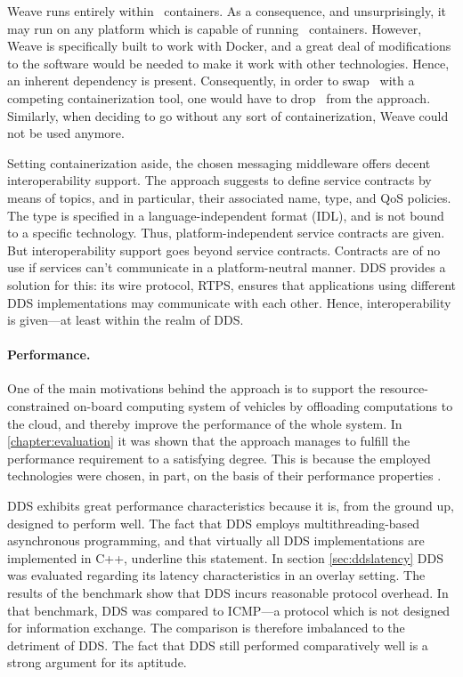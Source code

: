 Weave runs entirely within \docker\ containers. As a consequence, and unsurprisingly, it may run on any platform which is capable of running \docker\ containers. However, Weave is specifically built to work with Docker, and a great deal of modifications to the software would be needed to make it work with other technologies. Hence, an inherent dependency is present. Consequently, in order to swap \docker\ with a competing containerization tool, one would have to drop \wnet\ from the approach. Similarly, when deciding to go without any sort of containerization, Weave could not be used anymore.

Setting containerization aside, the chosen messaging middleware offers decent interoperability support. The approach suggests to define service contracts by means of topics, and in particular, their associated name, type, and QoS policies. The type is specified in a language-independent format (IDL), and is not bound to a specific technology. Thus, platform-independent service contracts are given. But interoperability support goes beyond service contracts. Contracts are of no use if services can't communicate in a platform-neutral manner. DDS provides a solution for this: its wire protocol, RTPS, ensures that applications using different DDS implementations may communicate with each other. Hence, interoperability is given---at least within the realm of DDS. 

\paragraph{Performance.}
One of the main motivations behind the approach is to support the resource-constrained on-board computing system of vehicles by offloading computations to the cloud, and thereby improve the performance of the whole system. In \autoref{chapter:evaluation} it was shown that the approach manages to fulfill the performance requirement to a satisfying degree. This is because the employed technologies were chosen, in part, on the basis of their performance properties .

DDS exhibits great performance characteristics because it is, from the ground up, designed to perform well. The fact that DDS employs multithreading-based asynchronous programming, and that virtually all DDS implementations are implemented in C++, underline this statement. In section \ref{sec:ddslatency} DDS was evaluated regarding its latency characteristics in an overlay setting. The results of the benchmark show that DDS incurs reasonable protocol overhead. In that benchmark, DDS was compared to ICMP---a protocol which is not designed for information exchange. The comparison is therefore imbalanced to the detriment of DDS. The fact that DDS still performed comparatively well is a strong argument for its aptitude. 

